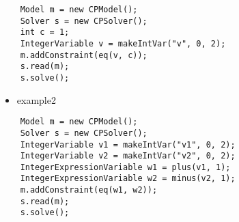 \begin{lstlisting}
	Model m = new CPModel();
	Solver s = new CPSolver();
	int c = 1;
	IntegerVariable v = makeIntVar("v", 0, 2);
	m.addConstraint(eq(v, c));
	s.read(m);
	s.solve();
\end{lstlisting}
\begin{itemize}
	\item example2
\end{itemize}

\begin{lstlisting}
	Model m = new CPModel();
	Solver s = new CPSolver();
	IntegerVariable v1 = makeIntVar("v1", 0, 2);
	IntegerVariable v2 = makeIntVar("v2", 0, 2);
	IntegerExpressionVariable w1 = plus(v1, 1);
	IntegerExpressionVariable w2 = minus(v2, 1);
	m.addConstraint(eq(w1, w2));
	s.read(m);
	s.solve();
\end{lstlisting}
